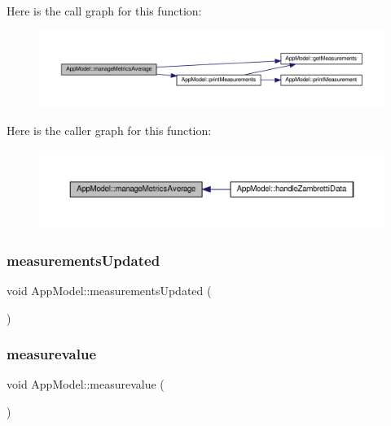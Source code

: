 Here is the call graph for this function\+:\nopagebreak
\begin{figure}[H]
\begin{center}
\leavevmode
\includegraphics[width=350pt]{class_app_model_a91f558862aad6b2509f03e49b549270e_cgraph}
\end{center}
\end{figure}
Here is the caller graph for this function\+:\nopagebreak
\begin{figure}[H]
\begin{center}
\leavevmode
\includegraphics[width=350pt]{class_app_model_a91f558862aad6b2509f03e49b549270e_icgraph}
\end{center}
\end{figure}
\mbox{\label{class_app_model_a1d9a24aeaab75b815f6500e9521dc091}} 
\subsubsection{\texorpdfstring{measurements\+Updated}{measurementsUpdated}}
{\footnotesize\ttfamily void App\+Model\+::measurements\+Updated (\begin{DoxyParamCaption}{ }\end{DoxyParamCaption})\hspace{0.3cm}{\ttfamily [signal]}}

\mbox{\label{class_app_model_a51e3556fa389b11c251a0a94f0a5655c}} 
\subsubsection{\texorpdfstring{measurevalue}{measurevalue}}
{\footnotesize\ttfamily void App\+Model\+::measurevalue (\begin{DoxyParamCaption}{ }\end{DoxyParamCaption})\hspace{0.3cm}{\ttfamily [slot]}}


